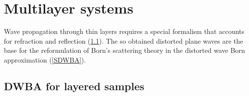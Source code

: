 

\chapter{Multilayer systems}  \label{sec:Multilayers}

%

Wave propagation through thin layers requires
a special formalism that accounts for
refraction and reflection (\cref{Swave21}).
The so obtained distorted plane waves are the base
for the reformulation of Born's scattering theory
in the distorted wave Born approximation (\cref{SDWBA}).


\section{DWBA for layered samples}\label{Swave21}

